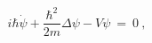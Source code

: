 \begin{equation}
{i\hbar \dot{\psi}+{\frac{\hbar ^{2}}{2m}}\Delta \psi -V\psi \ }={}{\ 0}\ ,
\label{Schrodeq}
\end{equation}%
